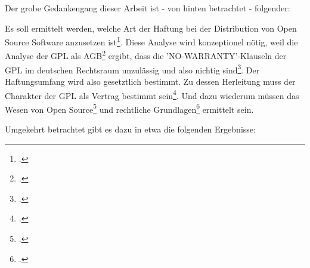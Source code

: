 \documentclass[DIV=calc,BCOR=5mm,11pt,headings=small,oneside,abstract=true, toc=bib]{scrartcl}
\begin{document}
Der grobe Gedankengang dieser Arbeit ist - von hinten betrachtet - folgender:

Es soll ermittelt werden, welche Art der Haftung bei der Distribution von Open
Source Software anzusetzen ist\footcite[vgl.][161ff]{Oberhem2008a}. Diese
Analyse wird konzeptionel nötig, weil die Analyse der GPL als
AGB\footcite[vgl.][133ff]{Oberhem2008a} ergibt, dass die 'NO-WARRANTY'-Klauseln
der GPL im deutschen Rechtsraum unzulässig und also nichtig
sind\footcite[vgl.][149ff]{Oberhem2008a}. Der Haftungsumfang wird also
gesetztlich bestimmt. Zu dessen Herleitung muss der Charakter der GPL als
Vertrag bestimmt sein\footcite[vgl.][93ff]{Oberhem2008a}. Und dazu wiederum
müssen das Wesen von Open Source\footcite[vgl.][5ff]{Oberhem2008a} und
rechtliche Grundlagen\footcite[vgl.][49ff]{Oberhem2008a} ermittelt sein.

Umgekehrt betrachtet gibt es dazu in etwa die folgenden Ergebnisse:
\end{document}
